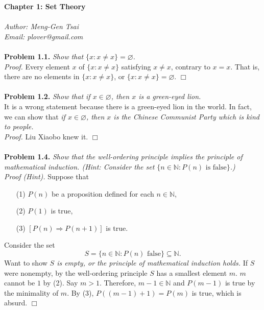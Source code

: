 \documentclass{article}
\begin{document}
\textbf{\Large Chapter 1: Set Theory} \\\\



\emph{Author: Meng-Gen Tsai} \\
\emph{Email: plover@gmail.com} \\\\



\textbf{Problem 1.1.}
\emph{Show that $\{ x : x \neq x \} = \varnothing$.} \\

\emph{Proof.}
Every element $x$ of $\{ x : x \neq x \}$ satisfying $x \neq x$,
contrary to $x = x$. That is, there are no elements in $\{ x : x \neq x \}$,
or $\{ x : x \neq x \} = \varnothing$.
$\Box$ \\\\



\textbf{Problem 1.2.}
\emph{Show that if $x \in \varnothing$, then $x$ is a green-eyed lion.} \\

It is a wrong statement because there is a green-eyed lion in the world.
In fact, we can show that
\emph{if $x \in \varnothing$,
then $x$ is the Chinese Communist Party which is kind to people.} \\

\emph{Proof.}
Liu Xiaobo knew it.
$\Box$ \\\\



\textbf{Problem 1.4.}
\emph{Show that the well-ordering principle implies
the principle of mathematical induction.
(Hint: Consider the set $\{ n \in \mathbb{N} : P(n) \text{ is false} \}$.)} \\

\emph{Proof (Hint).}
Suppose that
\begin{enumerate}
\item[(1)]
$P(n)$ be a proposition defined for each $n \in \mathbb{N}$,
\item[(2)]
$P(1)$ is true,
\item[(3)]
$[P(n) \Rightarrow P(n+1)]$ is true.
\end{enumerate}

Consider the set
$$S = \{ n \in \mathbb{N} : P(n) \text{ false} \} \subseteq \mathbb{N}.$$
Want to show
\emph{$S$ is empty, or the principle of mathematical induction holds.}
If $S$ were nonempty,
by the well-ordering principle $S$ has a smallest element $m$.
$m$ cannot be $1$ by (2).
Say $m > 1$.
Therefore, $m - 1 \in \mathbb{N}$
and $P(m-1)$ is true by the minimality of $m$.
By (3), $P((m-1)+1) = P(m)$ is true, which is absurd.
$\Box$ \\\\
\end{document}
